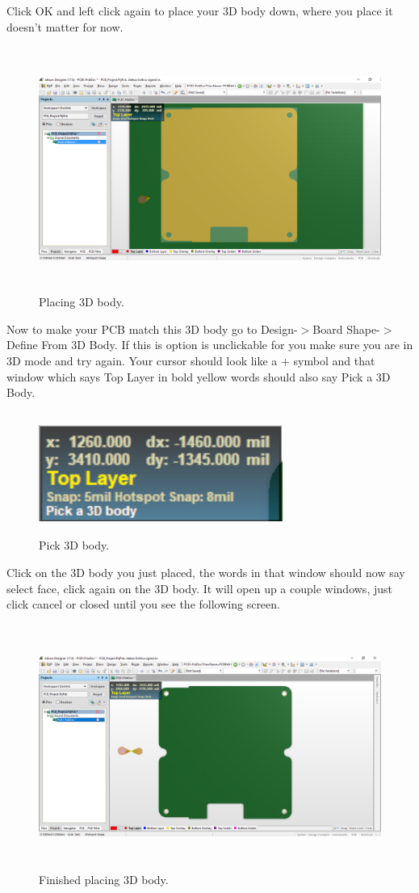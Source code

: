 \documentclass{article}
\begin{document}
	Click OK and left click again to place your 3D body down, where you place it doesn't matter for now.
	\begin{figure}[H]	
		\centering
		\includegraphics[width=16cm, height=8cm]{3d_body_pic1.png}
		\caption{Placing 3D body.}
		\label{fig 3}
	\end{figure}
	Now to make your PCB match this 3D body go to Design-$>$Board Shape-$>$Define From 3D Body. If this is option is unclickable for you make sure you are in 3D mode and try again. Your cursor should look like a + symbol and that window which says Top Layer in bold yellow words should also say Pick a 3D Body.
	\begin{figure}[H]	
		\centering
		\includegraphics[width=8cm, height=4cm]{pick_3d_body.png}
		\caption{Pick 3D body.}
		\label{fig 4}
	\end{figure}
	Click on the 3D body you just placed, the words in that window should now say select face, click again on the 3D body. It will open up a couple windows, just click cancel or closed until you see the following screen.

	\begin{figure}[H]	
		\centering
		\includegraphics[width=16cm, height=8cm]{3d_body_pic2.png}
		\caption{Finished placing 3D body.}
		\label{fig 5}
	\end{figure}
\end{document}
